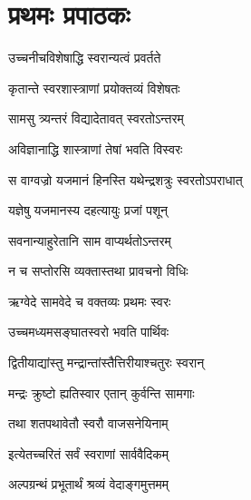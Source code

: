 \chapter{प्रथमः प्रपाठकः}

\resetShloka %

{उच्चनीचविशेषाद्धि स्वरान्यत्वं प्रवर्तते}

{कृतान्ते स्वरशास्त्राणां प्रयोक्तव्यं विशेषतः}

{सामसु त्र्यन्तरं विद्यादेतावत् स्वरतोऽन्तरम्}

{अविज्ञानाद्धि शास्त्राणां तेषां भवति विस्वरः}

{स वाग्वज्रो यजमानं हिनस्ति यथेन्द्रशत्रुः स्वरतोऽपराधात्}

{यज्ञेषु यजमानस्य दहत्यायुः प्रजां पशून्}

{सवनान्याहुरेतानि साम वाप्यर्थतोऽन्तरम्}

{न च सप्तोरसि व्यक्तास्तथा प्रावचनो विधिः}

{ऋग्वेदे सामवेदे च वक्तव्यः प्रथमः स्वरः}

{उच्चमध्यमसङ्घातस्वरो भवति पार्थिवः}

{द्वितीयाद्यांस्तु मन्द्रान्तांस्तैत्तिरीयाश्चतुरः स्वरान्}

{मन्द्रः क्रुष्टो ह्यतिस्वार एतान् कुर्वन्ति सामगाः}

{तथा शतपथावेतौ स्वरौ वाजसनेयिनाम्}

{इत्येतच्चरितं सर्वं स्वराणां सार्ववैदिकम्}

\closesub

\resetShloka

{अल्पग्रन्थं प्रभूतार्थं श्रव्यं वेदाङ्गमुत्तमम्}

